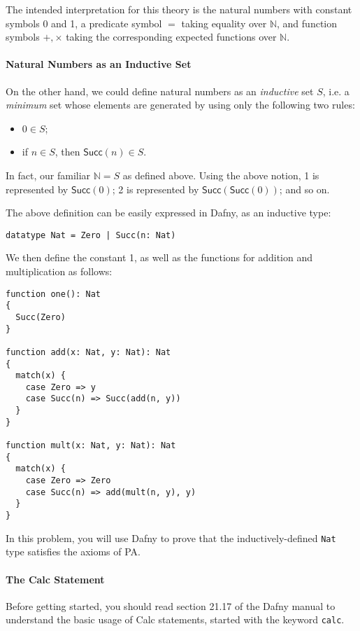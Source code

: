 \documentclass[11pt,a4paper]{article}
\newcommand{\nat}{\mathbb{N}}
\begin{document}
The intended interpretation for this theory is the natural numbers with constant symbols 0 and 1, a predicate symbol $=$ taking equality over $\nat$, and function symbols $+,\times$ taking the corresponding expected functions over $\nat$.

\paragraph*{Natural Numbers as an Inductive Set}

On the other hand, we could define natural numbers as an \emph{inductive} set $S$, i.e. a \emph{minimum} set whose elements are generated by using only the following two rules:
\begin{itemize}
    \item $0 \in S$;
    \item if $n \in S$, then $\textsf{Succ}(n) \in S$.
\end{itemize}
In fact, our familiar $\nat = S$ as defined above.
Using the above notion, 1 is represented by $\textsf{Succ}(0)$; 2 is represented by $\textsf{Succ}(\textsf{Succ}(0))$; and so on.

The above definition can be easily expressed in Dafny, as an inductive type:
\begin{lstlisting}
datatype Nat = Zero | Succ(n: Nat)
\end{lstlisting}
We then define the constant 1, as well as the functions for addition and multiplication as follows:
\begin{lstlisting}
function one(): Nat
{
  Succ(Zero)
}

function add(x: Nat, y: Nat): Nat
{
  match(x) {
    case Zero => y
    case Succ(n) => Succ(add(n, y))
  }
}

function mult(x: Nat, y: Nat): Nat
{
  match(x) {
    case Zero => Zero
    case Succ(n) => add(mult(n, y), y)
  }
}
\end{lstlisting}

In this problem, you will use Dafny to prove that the inductively-defined \texttt{Nat} type satisfies the axioms of PA.

\paragraph*{The Calc Statement}

Before getting started, you should read section 21.17 of the Dafny manual to understand the basic usage of Calc statements, started with the keyword \texttt{calc}.
\end{document}
